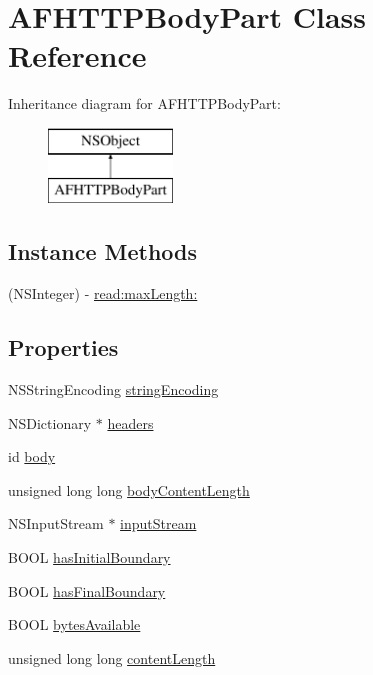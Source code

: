 \hypertarget{interface_a_f_h_t_t_p_body_part}{\section{A\-F\-H\-T\-T\-P\-Body\-Part Class Reference}
\label{interface_a_f_h_t_t_p_body_part}
}
Inheritance diagram for A\-F\-H\-T\-T\-P\-Body\-Part\-:\begin{figure}[H]
\begin{center}
\leavevmode
\includegraphics[height=2.000000cm]{interface_a_f_h_t_t_p_body_part}
\end{center}
\end{figure}
\subsection*{Instance Methods}
\begin{DoxyCompactItemize}
\item 
(N\-S\-Integer) -\/ \hyperlink{interface_a_f_h_t_t_p_body_part_ac6ae29af0ce8cb181e029696c6477a78}{read\-:max\-Length\-:}
\end{DoxyCompactItemize}
\subsection*{Properties}
\begin{DoxyCompactItemize}
\item 
N\-S\-String\-Encoding \hyperlink{interface_a_f_h_t_t_p_body_part_a842a1899ac06a5ca474a00d1c7a7d7fd}{string\-Encoding}
\item 
N\-S\-Dictionary $\ast$ \hyperlink{interface_a_f_h_t_t_p_body_part_ae26ac134d0864251aed8657f1c18af9f}{headers}
\item 
id \hyperlink{interface_a_f_h_t_t_p_body_part_ac1114eccbce0168c1638381fbcfb2c12}{body}
\item 
unsigned long long \hyperlink{interface_a_f_h_t_t_p_body_part_a589888098707edf77aa77087dd0411d3}{body\-Content\-Length}
\item 
N\-S\-Input\-Stream $\ast$ \hyperlink{interface_a_f_h_t_t_p_body_part_ac3f0670e909127c919888f6d71c3bb54}{input\-Stream}
\item 
B\-O\-O\-L \hyperlink{interface_a_f_h_t_t_p_body_part_aa43219e1933ce7f23e3925a771ae3123}{has\-Initial\-Boundary}
\item 
B\-O\-O\-L \hyperlink{interface_a_f_h_t_t_p_body_part_a744eb48419786f372cf19da986dca356}{has\-Final\-Boundary}
\item 
B\-O\-O\-L \hyperlink{interface_a_f_h_t_t_p_body_part_af0479ae737ea32125a69debf91b87664}{bytes\-Available}
\item 
unsigned long long \hyperlink{interface_a_f_h_t_t_p_body_part_a9e1bea39dee4d8a0c13132f2abd1bd94}{content\-Length}
\end{DoxyCompactItemize}


